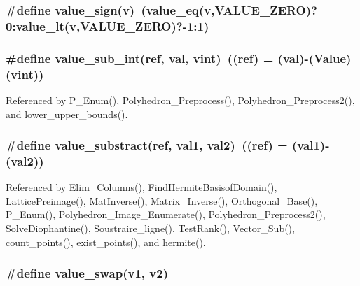 \subsubsection{\setlength{\rightskip}{0pt plus 5cm}\#define value\_\-sign(v)\ (value\_\-eq(v,VALUE\_\-ZERO)?0:value\_\-lt(v,VALUE\_\-ZERO)?-1:1)}\label{arithmetique_8h_a28}


\subsubsection{\setlength{\rightskip}{0pt plus 5cm}\#define value\_\-sub\_\-int(ref, val, vint)\ ((ref) = (val)-(Value)(vint))}\label{arithmetique_8h_a49}




Referenced by P\_\-Enum(), Polyhedron\_\-Preprocess(), Polyhedron\_\-Preprocess2(), and lower\_\-upper\_\-bounds().

\subsubsection{\setlength{\rightskip}{0pt plus 5cm}\#define value\_\-substract(ref, val1, val2)\ ((ref) = (val1)-(val2))}\label{arithmetique_8h_a48}




Referenced by Elim\_\-Columns(), Find\-Hermite\-Basisof\-Domain(), Lattice\-Preimage(), Mat\-Inverse(), Matrix\_\-Inverse(), Orthogonal\_\-Base(), P\_\-Enum(), Polyhedron\_\-Image\_\-Enumerate(), Polyhedron\_\-Preprocess2(), Solve\-Diophantine(), Soustraire\_\-ligne(), Test\-Rank(), Vector\_\-Sub(), count\_\-points(), exist\_\-points(), and hermite().

\subsubsection{\setlength{\rightskip}{0pt plus 5cm}\#define value\_\-swap(v1, v2)}\label{arithmetique_8h_a17}


